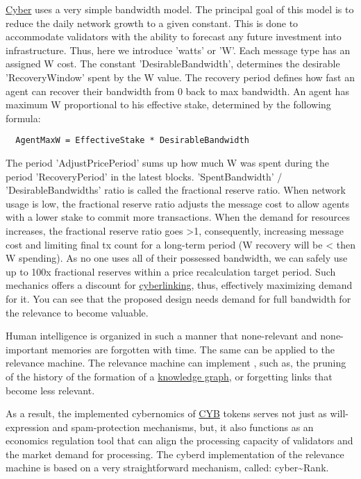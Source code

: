 \documentclass[8pt,oneside]{amsart}
\newcommand{\linkgreen}[2]{\href{#1}{\color{green}{#2}}}
\newcommand{\code}[1]{{\PlayBold #1}}
\begin{document}
{\hyperref[cyber]{Cyber}} uses a very simple bandwidth model. The principal goal of this model is to reduce the daily network growth to a given constant. This is done to accommodate validators with the ability to forecast any future investment into infrastructure. Thus, here we introduce 'watts' or 'W'. Each message type has an assigned W cost. The constant 'DesirableBandwidth', determines the desirable 'RecoveryWindow' spent by the W value. The recovery period defines how fast an agent can recover their bandwidth from 0 back to max bandwidth. An agent has maximum W proportional to his effective stake, determined by the following formula:
\begin{lstlisting}
  AgentMaxW = EffectiveStake * DesirableBandwidth
\end{lstlisting}

The period 'AdjustPricePeriod' sums up how much W was spent during the period 'RecoveryPeriod' in the latest blocks. 'SpentBandwidth' / 'DesirableBandwidths' ratio is called the fractional reserve ratio. When network usage is low, the fractional reserve ratio adjusts the message cost to allow agents with a lower stake to commit more transactions. When the demand for resources increases, the fractional reserve ratio goes \code{>1}, consequently, increasing message cost and limiting final tx count for a long-term period (W recovery will be \code{<} then W spending). As no one uses all of their possessed bandwidth, we can safely use up to 100x fractional reserves within a price recalculation target period. Such mechanics offers a discount for {\hyperref[cyberlinks]{cyberlinking}}, thus, effectively maximizing demand for it. You can see that the proposed design needs demand for full bandwidth for the relevance to become valuable.

Human intelligence is organized in such a manner that none-relevant and none-important memories are forgotten with time. The same can be applied to the relevance machine. The relevance machine can implement \linkgreen{https://ipfs.io/ipfs/QmP81EcuNDZHQutvdcDjbQEqiTYUzU315aYaTyrVj6gtJb}{aggressive pruning strategies}, such as, the pruning of the history of the formation of a {\hyperref[knowledge-graph]{knowledge graph}}, or forgetting links that become less relevant.

As a result, the implemented cybernomics of {\hyperref[cyb]{CYB}} tokens serves not just as will-expression and spam-protection mechanisms, but, it also functions as an economics regulation tool that can align the processing capacity of validators and the market demand for processing. The cyberd implementation of the relevance machine is based on a very straightforward mechanism, called: cyber\~{}Rank.
\end{document}
